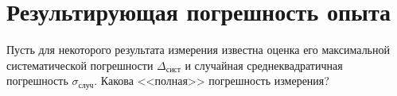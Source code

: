 

\section{Результирующая погрешность опыта}

Пусть для некоторого результата измерения известна оценка его максимальной
систематической погрешности $\Delta_{\text{сист}}$ и случайная среднеквадратичная
погрешность $\sigma_{\text{случ}}$. Какова <<полная>>
погрешность измерения?

